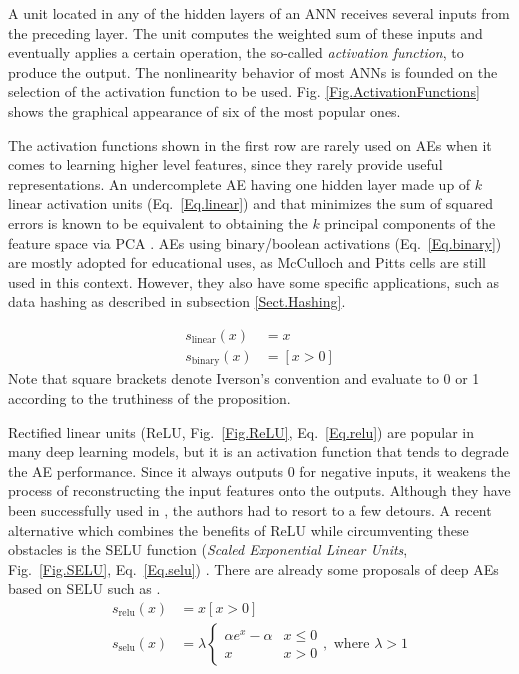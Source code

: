 \documentclass[preprint,5p,compress]{elsarticle}
\begin{document}
A unit located in any of the hidden layers of an ANN receives several inputs from the preceding layer. The unit computes the weighted sum of these inputs and eventually applies a certain operation, the so-called \textit{activation function}, to produce the output. The nonlinearity behavior of most ANNs is founded on the selection of the activation function to be used. Fig. \ref{Fig.ActivationFunctions} shows the graphical appearance of six of the most popular ones.


The activation functions shown in the first row are rarely used on AEs when it comes to learning higher level features, since they rarely provide useful representations. An undercomplete AE having one hidden layer made up of $k$ linear activation units (Eq.~\ref{Eq.linear}) and that minimizes the sum of squared errors is known to be equivalent to obtaining the $k$ principal components of the feature space via PCA \cite{ANNsPCA2,ANNsPCA,AutoencoderScoring}. AEs using binary/boolean activations (Eq.~\ref{Eq.binary}) \cite{deng_binary_2010,baldi_autoencoders_2012} are mostly adopted for educational uses, as McCulloch and Pitts \cite{McCullochPitts} cells are still used in this context. However, they also have some specific applications, such as data hashing as described in subsection \ref{Sect.Hashing}.

\begin{align}
  \label{Eq.linear} s_{\mathrm{linear}}(x) &= x \\
  \label{Eq.binary} s_{\mathrm{binary}}(x) &= [x > 0]
\end{align}
Note that square brackets denote Iverson's convention \cite{KnuthNotation} and evaluate to 0 or 1 according to the truthiness of the proposition. 

Rectified linear units (ReLU, Fig.~\ref{Fig.ReLU}, Eq.~\ref{Eq.relu}) are popular in many deep learning models, but it is an activation function that tends to degrade the AE performance. Since it always outputs 0 for negative inputs, it weakens the process of reconstructing the input features onto the outputs. Although they have been successfully used in \cite{RELUinAEs,RELUinAEs2}, the authors had to resort to a few detours. A recent alternative which combines the benefits of ReLU while circumventing these obstacles is the SELU function (\textit{Scaled Exponential Linear Units}, Fig.~\ref{Fig.SELU}, Eq.~\ref{Eq.selu}) \cite{SELU}. There are already some proposals of deep AEs based on SELU such as \cite{DeepAEwSELU}.
\begin{align}
  \label{Eq.relu} s_{\mathrm{relu}}(x) &= x[x > 0] \\
  \label{Eq.selu} s_{\mathrm{selu}}(x) &= \lambda \begin{cases} \alpha e^x-\alpha & x \leq 0 \\ x & x > 0 \end{cases},\text{ where }\lambda>1
\end{align}
\end{document}
